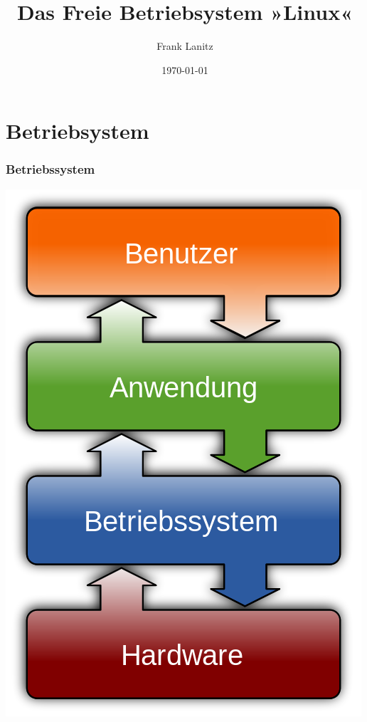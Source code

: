 \documentclass[]{beamer}
\title{Das Freie Betriebsystem »Linux«}
\author{Frank Lanitz}
\date{\today}
\begin{document}
\begin{frame}
	\tableofcontents{}
\end{frame}
\section{Betriebsystem}
\begin{frame}
	\frametitle{Betriebssystem}
	\begin{center}
	\includegraphics[scale=0.25]{media/500px-Operating_system_placement-de.png}
	\end{center}
\end{frame}
\end{document}
